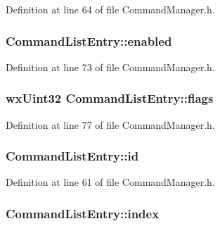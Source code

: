 Definition at line 64 of file Command\+Manager.\+h.

\subsubsection[{\texorpdfstring{enabled}{enabled}}]{ Command\+List\+Entry\+::enabled}\hypertarget{struct_command_list_entry_a984b0e5c3fbfb22365747c6f6cca5f60}{}\label{struct_command_list_entry_a984b0e5c3fbfb22365747c6f6cca5f60}


Definition at line 73 of file Command\+Manager.\+h.

\subsubsection[{\texorpdfstring{flags}{flags}}]{\setlength{\rightskip}{0pt plus 5cm}wx\+Uint32 Command\+List\+Entry\+::flags}\hypertarget{struct_command_list_entry_a7e7201bbb8989220b607596085b96dbb}{}\label{struct_command_list_entry_a7e7201bbb8989220b607596085b96dbb}


Definition at line 77 of file Command\+Manager.\+h.

\subsubsection[{\texorpdfstring{id}{id}}]{ Command\+List\+Entry\+::id}\hypertarget{struct_command_list_entry_a6d157a570f95928cedd1a69ff5ba39ae}{}\label{struct_command_list_entry_a6d157a570f95928cedd1a69ff5ba39ae}


Definition at line 61 of file Command\+Manager.\+h.

\subsubsection[{\texorpdfstring{index}{index}}]{ Command\+List\+Entry\+::index}\hypertarget{struct_command_list_entry_a8f149791c63f259a86a70f099440c337}{}\label{struct_command_list_entry_a8f149791c63f259a86a70f099440c337}


